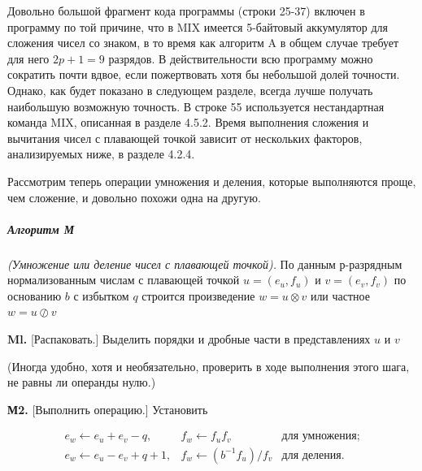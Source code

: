 {\begin{longtable}{l l l l l}
\end{longtable}

Довольно большой фрагмент кода программы (строки 25-37) включен в программу по той причине, что в MIX имеется 5-байтовый аккумулятор для сложения чисел со знаком, в то время как алгоритм A в общем случае требует для него $2p + 1 = 9$ разрядов. В действительности всю программу можно сократить почти вдвое, если пожертвовать хотя бы небольшой долей точности. Однако, как будет показано в следующем разделе, всегда лучше получать наибольшую возможную точность. В строке 55 используется нестандартная команда MIX, описанная в разделе 4.5.2. Время выполнения сложения и вычитания чисел с плавающей точкой зависит от нескольких факторов, анализируемых ниже, в разделе 4.2.4.

Рассмотрим теперь операции умножения и деления, которые выполняются проще, чем сложение, и довольно похожи одна на другую.

\subparagraph{Алгоритм М} \textit{(Умножение или деление чисел с плавающей точкой).} По данным р-разрядным нормализованным числам с плавающей точкой $u = (e_u,f_u)$ и $v = (e_v, f_v)$ по основанию $b$ с избытком $q$ строится произведение $w = u \otimes v$ или частное
$w = u \oslash v$

\textbf{Ml.} [Распаковать.] Выделить порядки и дробные части в представлениях $u$ и $v$

\noindent(Иногда удобно, хотя и необязательно, проверить в ходе выполнения этого шага, не равны ли операнды нулю.)

\textbf{М2.} [Выполнить операцию.] Установить

%

\begin{equation} 
\begin{array}{lll} 
e_w \leftarrow e_u + e_v - q, & f_w \leftarrow f_u f_v &\text{для умножения;}\\ 
e_w \leftarrow e_u - e_v + q + 1, &f_w \leftarrow (b^{-1}f_u)/f_v &\text{для деления.}\\

\end{array} 
\end{equation}

}
